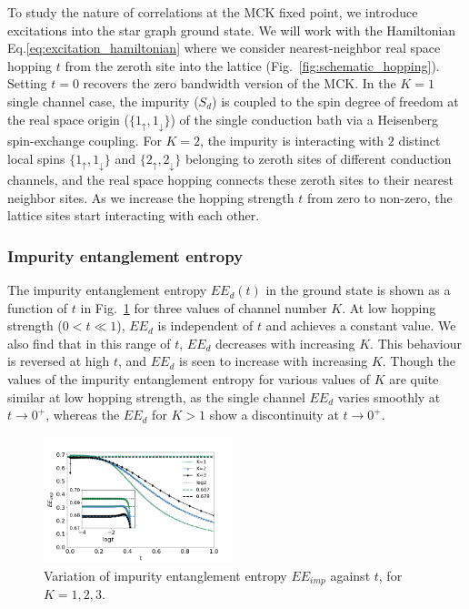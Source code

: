 \documentclass[reprint,prb,superscriptaddress]{revtex4-2}
\begin{document}
To study the nature of correlations at the MCK fixed point, we introduce excitations into the star graph ground state. We will work with the Hamiltonian Eq.\eqref{eq:excitation_hamiltonian} where we consider nearest-neighbor real space hopping \(t\) from the zeroth site into the lattice (Fig.~\ref{fig:schematic_hopping}). Setting $t=0$ recovers the zero bandwidth version of the MCK. In the \(K=1\) single channel case, the impurity ($S_d$) is coupled to the spin degree of freedom at the real space origin ($\{1_{\uparrow},1_{\downarrow}\}$) of the single conduction bath via a Heisenberg spin-exchange coupling. For $K=2$, the impurity is interacting with $2$ distinct local spins $\{1_{\uparrow},1_{\downarrow}\}$ and $\{2_{\uparrow},2_{\downarrow}\}$ belonging to zeroth sites of different conduction channels, and the real space hopping connects these zeroth sites to their nearest neighbor sites. As we increase the hopping strength $t$ from zero to non-zero, the lattice sites start interacting with each other.

\subsubsection{Impurity entanglement entropy}
The impurity entanglement entropy $EE_d(t)$ in the ground state is shown as a function of $t$ in Fig.~\ref{fig:EE_imp_vs_t_K} for three values of channel number \(K\). At low hopping strength ($0<t\ll 1$), $EE_{d}$ is independent of $t$ and achieves a constant value. We also find that in this range of \(t\), \(EE_d\) decreases with increasing \(K\). This behaviour is reversed at high $t$, and \(EE_d\) is seen to increase with increasing \(K\). Though the values of the impurity entanglement entropy for various values of \(K\) are quite similar at low hopping strength, 
as the single channel \(EE_d\) varies smoothly at \(t \to 0^+\), whereas the \(EE_d\) for \(K > 1\) show a discontinuity at $t \to 0^+$.

\begin{figure}[!htpb]
\centering
\includegraphics[width=0.49\textwidth]{AI1ch123d}
\caption{Variation of impurity entanglement entropy $EE_{imp}$ against $t$, for $K=1,2,3$. }
\label{fig:EE_imp_vs_t_K}
\end{figure}
\end{document}
